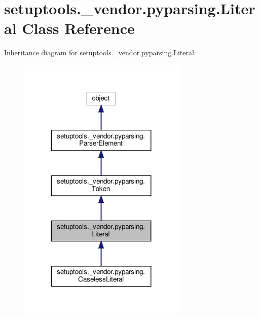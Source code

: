 \hypertarget{classsetuptools_1_1__vendor_1_1pyparsing_1_1Literal}{}\section{setuptools.\+\_\+vendor.\+pyparsing.\+Literal Class Reference}
\label{classsetuptools_1_1__vendor_1_1pyparsing_1_1Literal}


Inheritance diagram for setuptools.\+\_\+vendor.\+pyparsing.\+Literal\+:
\nopagebreak
\begin{figure}[H]
\begin{center}
\leavevmode
\includegraphics[width=227pt]{classsetuptools_1_1__vendor_1_1pyparsing_1_1Literal__inherit__graph}
\end{center}
\end{figure}


